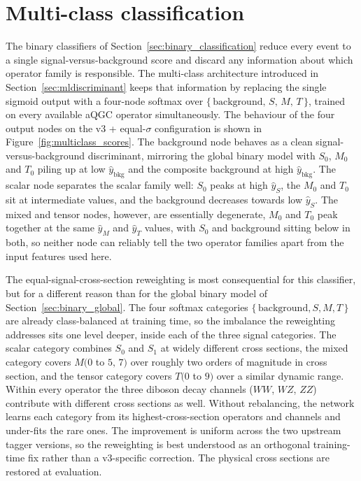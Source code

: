 \section{Multi-class classification}
\label{sec:multiclass_classification}

The binary classifiers of Section~\ref{sec:binary_classification} reduce every event to a single signal-versus-background score and discard any information about which operator family is responsible. The multi-class architecture introduced in Section~\ref{sec:mldiscriminant} keeps that information by replacing the single sigmoid output with a four-node softmax over $\{\,\mathrm{background},\,S,\,M,\,T\,\}$, trained on every available aQGC operator simultaneously. The behaviour of the four output nodes on the v3 + equal-$\sigma$ configuration is shown in Figure~\ref{fig:multiclass_scores}. The background node behaves as a clean signal-versus-background discriminant, mirroring the global binary model with $S_0$, $M_0$ and $T_0$ piling up at low $\hat{y}_{\mathrm{bkg}}$ and the composite background at high $\hat{y}_{\mathrm{bkg}}$. The scalar node separates the scalar family well: $S_0$ peaks at high $\hat{y}_S$, the $M_0$ and $T_0$ sit at intermediate values, and the background decreases towards low $\hat{y}_S$. The mixed and tensor nodes, however, are essentially degenerate, $M_0$ and $T_0$ peak together at the same $\hat{y}_M$ and $\hat{y}_T$ values, with $S_0$ and background sitting below in both, so neither node can reliably tell the two operator families apart from the input features used here.

The equal-signal-cross-section reweighting is most consequential for this classifier, but for a different reason than for the global binary model of Section~\ref{sec:binary_global}. The four softmax categories $\{\,\mathrm{background},S,M,T\,\}$ are already class-balanced at training time, so the imbalance the reweighting addresses sits one level deeper, inside each of the three signal categories. The scalar category combines $S_0$ and $S_1$ at widely different cross sections, the mixed category covers $M(0$ to $5,\,7)$ over roughly two orders of magnitude in cross section, and the tensor category covers $T(0$ to $9)$ over a similar dynamic range. Within every operator the three diboson decay channels ($WW$, $WZ$, $ZZ$) contribute with different cross sections as well. Without rebalancing, the network learns each category from its highest-cross-section operators and channels and under-fits the rare ones. The improvement is uniform across the two upstream tagger versions, so the reweighting is best understood as an orthogonal training-time fix rather than a v3-specific correction. The physical cross sections are restored at evaluation.

